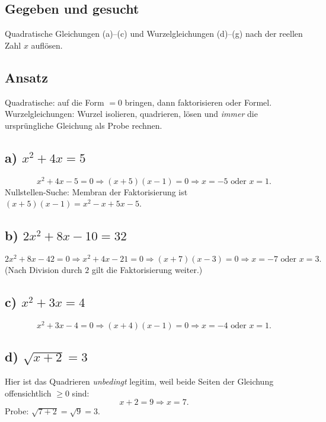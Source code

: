 

\subsection*{Gegeben und gesucht}
Quadratische Gleichungen (a)--(c) und Wurzelgleichungen (d)--(g) nach der
reellen Zahl $x$ auflösen.

\subsection*{Ansatz}
Quadratische: auf die Form $=0$ bringen, dann faktorisieren oder Formel.
Wurzelgleichungen: Wurzel isolieren, quadrieren, lösen und
\emph{immer} die ursprüngliche Gleichung als Probe rechnen.

\subsection*{a) $x^2+4x=5$}
\begin{equation}
  x^2+4x-5=0 \Rightarrow (x+5)(x-1)=0 \Rightarrow x=-5 \text{ oder } x=1.
\end{equation}
Nullstellen-Suche: Membran der Faktorisierung ist $(x+5)(x-1)=x^2-x+5x-5$.

\subsection*{b) $2x^2+8x-10=32$}
\begin{equation}
  2x^2+8x-42=0 \Rightarrow x^2+4x-21=0\Rightarrow (x+7)(x-3)=0
  \Rightarrow x=-7 \text{ oder } x=3.
\end{equation}
(Nach Division durch $2$ gilt die Faktorisierung weiter.)

\subsection*{c) $x^2+3x=4$}
\begin{equation}
  x^2+3x-4=0\Rightarrow (x+4)(x-1)=0\Rightarrow x=-4 \text{ oder } x=1.
\end{equation}

\subsection*{d) $\sqrt{x+2}=3$}
Hier ist das Quadrieren \emph{unbedingt} legitim, weil beide Seiten der
Gleichung offensichtlich $\ge0$ sind:
\begin{equation}
  x+2=9\Rightarrow x=7.
\end{equation}
Probe: $\sqrt{7+2}=\sqrt9=3$. \checkmark

